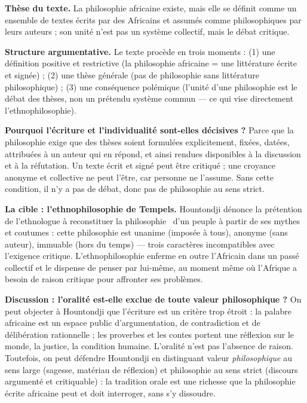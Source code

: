 \documentclass[11pt]{article}
\begin{document}
\begin{corrige}

\textbf{Thèse du texte.} La philosophie africaine existe, mais elle se définit comme un ensemble de textes écrits par des Africains et assumés comme philosophiques par leurs auteurs ; son unité n'est pas un système collectif, mais le débat critique.

\textbf{Structure argumentative.} Le texte procède en trois moments : (1) une définition positive et restrictive (la philosophie africaine = une littérature écrite et signée) ; (2) une thèse générale (pas de philosophie sans littérature philosophique) ; (3) une conséquence polémique (l'unité d'une philosophie est le débat des thèses, non un prétendu système commun — ce qui vise directement l'ethnophilosophie).

\textbf{Pourquoi l'écriture et l'individualité sont-elles décisives ?} Parce que la philosophie exige que des thèses soient formulées explicitement, fixées, datées, attribuées à un auteur qui en répond, et ainsi rendues disponibles à la discussion et à la réfutation. Un texte écrit et signé peut être critiqué ; une croyance anonyme et collective ne peut l'être, car personne ne l'assume. Sans cette condition, il n'y a pas de débat, donc pas de philosophie au sens strict.

\textbf{La cible : l'ethnophilosophie de Tempels.} Hountondji dénonce la prétention de l'ethnologue à reconstituer la \guillemotleft philosophie \guillemotright\ d'un peuple à partir de ses mythes et coutumes : cette philosophie est unanime (imposée à tous), anonyme (sans auteur), immuable (hors du temps) — trois caractères incompatibles avec l'exigence critique. L'ethnophilosophie enferme en outre l'Africain dans un passé collectif et le dispense de penser par lui-même, au moment même où l'Afrique a besoin de raison critique pour affronter ses problèmes.

\textbf{Discussion : l'oralité est-elle exclue de toute valeur philosophique ?} On peut objecter à Hountondji que l'écriture est un critère trop étroit : la palabre africaine est un espace public d'argumentation, de contradiction et de délibération rationnelle ; les proverbes et les contes portent une réflexion sur le monde, la justice, la condition humaine. L'oralité n'est pas l'absence de raison. Toutefois, on peut défendre Hountondji en distinguant valeur \emph{philosophique} au sens large (sagesse, matériau de réflexion) et philosophie au sens strict (discours argumenté et critiquable) : la tradition orale est une richesse que la philosophie écrite africaine peut et doit interroger, sans s'y dissoudre.


\end{corrige}
\end{document}
